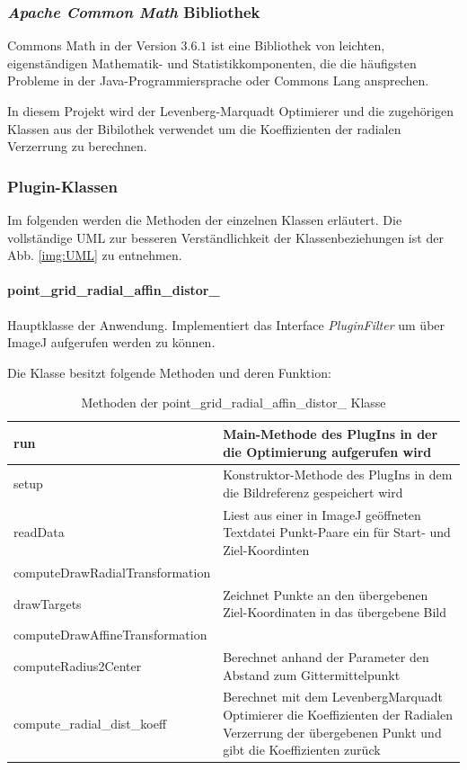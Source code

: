 \subsubsection{\textit{Apache Common Math} Bibliothek}
Commons Math in der Version $3.6.1$ ist eine Bibliothek von leichten, eigenständigen Mathematik- und Statistikkomponenten, die die häufigsten Probleme in der Java-Programmiersprache oder Commons Lang ansprechen.
\cite{appache}

In diesem Projekt wird der Levenberg-Marquadt Optimierer und die zugehörigen Klassen aus der Bibilothek verwendet um die Koeffizienten der radialen Verzerrung zu berechnen.

\subsubsection{Plugin-Klassen}

Im folgenden werden die Methoden der einzelnen Klassen erläutert. Die vollständige UML zur besseren Verständlichkeit der Klassenbeziehungen ist der Abb. \ref{img:UML} zu entnehmen.

\paragraph{point\_grid\_radial\_affin\_distor\_}
Hauptklasse der Anwendung. Implementiert das Interface \emph{PluginFilter} um über ImageJ aufgerufen werden zu können.

Die Klasse besitzt folgende Methoden und deren Funktion:

\begin{table}[H]
\begin{tabular}{p{} | p{}} 
run & Main-Methode des PlugIns in der die Optimierung aufgerufen wird\\ \hline
setup & Konstruktor-Methode des PlugIns in dem die Bildreferenz gespeichert wird\\ \hline
readData & Liest aus einer in ImageJ geöffneten Textdatei Punkt-Paare ein für Start- und Ziel-Koordinten\\
computeDrawRadialTransformation & \\ \hline
drawTargets & Zeichnet Punkte an den übergebenen Ziel-Koordinaten in das übergebene Bild\\ \hline
computeDrawAffineTransformation & \\ \hline
computeRadius2Center & Berechnet anhand der Parameter den Abstand zum Gittermittelpunkt\\ \hline
compute\_radial\_dist\_koeff & Berechnet mit dem LevenbergMarquadt Optimierer die Koeffizienten der Radialen Verzerrung der übergebenen Punkt und gibt die Koeffizienten zurück\\ 
\end{tabular}
\caption{Methoden der point\_grid\_radial\_affin\_distor\_ Klasse}
\end{table}

